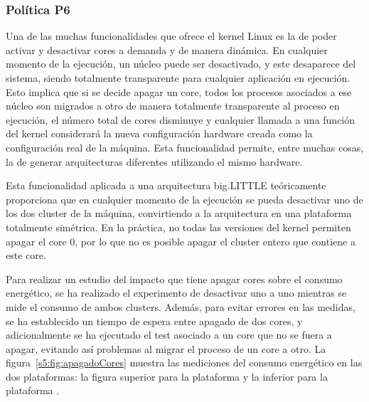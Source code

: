 \subsubsection{Política P6}
Una de las muchas funcionalidades que ofrece el kernel Linux es la de poder
activar y desactivar cores a demanda y de manera dinámica. En cualquier
momento de la ejecución, un núcleo puede ser desactivado, y este desaparece
del sistema, siendo totalmente transparente para cualquier aplicación en
ejecución. Esto implica que si se decide apagar un core, todos los procesos
asociados a ese núcleo son migrados a otro de manera totalmente
transparente al proceso en ejecución, el número total de cores disminuye y
cualquier llamada a una función del kernel considerará la nueva
configuración hardware creada como la configuración real de la
máquina. Esta funcionalidad permite, entre muchas cosas, la de generar
arquitecturas diferentes utilizando el mismo hardware.

Esta funcionalidad aplicada a una arquitectura big.LITTLE teóricamente
proporciona que en cualquier momento de la ejecución se pueda desactivar
uno de los dos cluster de la máquina, convirtiendo a la arquitectura en una
plataforma totalmente simétrica. En la práctica, no todas las versiones
del kernel permiten apagar el core 0, por lo que no es posible apagar el
cluster entero que contiene a este core.

Para realizar un estudio del impacto que tiene apagar cores sobre el
consumo energético, se ha realizado el experimento de desactivar uno a uno
mientras se mide el consumo de ambos clusters. Además, para evitar
errores en las medidas, se ha establecido un tiempo de espera entre apagado
de dos cores, y adicionalmente se ha ejecutado el test asociado a un core
que no se fuera a apagar, evitando así problemas al migrar el proceso de un
core a otro. La figura~\ref{s5:fig:apagadoCores} muestra las mediciones del
consumo energético en las dos plataformas: la figura superior para la
plataforma \juno y la inferior para la plataforma \odroid.

